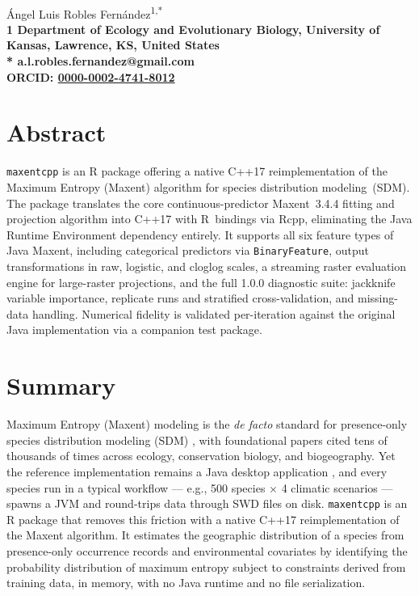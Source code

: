 \documentclass[10pt,letterpaper]{article}
\begin{document}
\vspace*{0.35in}

\begin{flushleft}
{\Large
\textbf{}
}
\newline
\\
\'Angel Luis Robles Fern\'andez\textsuperscript{1,*}
\\
\bigskip
\bf{1} Department of Ecology and Evolutionary Biology, University of Kansas, Lawrence, KS, United States
\\
\bigskip
* a.l.robles.fernandez@gmail.com
\\
ORCID: \href{https://orcid.org/0000-0002-4741-8012}{0000-0002-4741-8012}

\end{flushleft}

\section*{Abstract}

\texttt{maxentcpp} is an R package offering a native C++17
reimplementation of the Maximum Entropy (Maxent) algorithm for species
distribution modeling~(SDM). The package translates the core
continuous-predictor Maxent~3.4.4 fitting and projection algorithm into
C++17 with R~bindings via Rcpp, eliminating the Java Runtime Environment
dependency entirely. It supports all six feature types of Java Maxent,
including categorical predictors via \texttt{BinaryFeature}, output
transformations in raw, logistic, and cloglog scales, a streaming raster
evaluation engine for large-raster projections, and the full 1.0.0
diagnostic suite: jackknife variable importance, replicate runs and
stratified cross-validation, and missing-data handling. Numerical
fidelity is validated per-iteration against the original Java
implementation via a companion test package.

\linenumbers

\section*{Summary}

Maximum Entropy (Maxent) modeling is the \emph{de facto} standard for
presence-only species distribution modeling (SDM)
\cite{Phillips2006,Elith2011}, with foundational papers cited tens of
thousands of times across ecology, conservation biology, and
biogeography. Yet the reference implementation remains a Java desktop
application \cite{Phillips2017}, and every species run in a typical
workflow --- e.g., 500 species \(\times\) 4 climatic scenarios ---
spawns a JVM and round-trips data through SWD files on disk.
\texttt{maxentcpp} is an R package that removes this friction with a
native C++17 reimplementation of the Maxent algorithm. It estimates the
geographic distribution of a species from presence-only occurrence
records and environmental covariates by identifying the probability
distribution of maximum entropy \cite{Jaynes1957} subject to
constraints derived from training data, in memory, with no Java runtime
and no file serialization.
\end{document}
